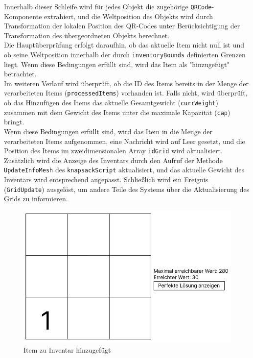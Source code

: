 Innerhalb dieser Schleife wird für jedes Objekt die zugehörige \texttt{QRCode}-Komponente extrahiert, und die Weltposition
des Objekts wird durch Transformation der lokalen Position des QR-Codes unter Berücksichtigung der Transformation des
übergeordneten Objekts berechnet.\\

Die Hauptüberprüfung erfolgt daraufhin, ob das aktuelle Item nicht null ist und ob seine Weltposition innerhalb der durch
\texttt{inventoryBounds} definierten Grenzen liegt. Wenn diese Bedingungen erfüllt sind, wird das Item als "hinzugefügt"
betrachtet.\\

Im weiteren Verlauf wird überprüft, ob die ID des Items bereits in der Menge der verarbeiteten Items (\texttt{processedItems})
vorhanden ist. Falls nicht, wird überprüft, ob das Hinzufügen des Items das aktuelle Gesamtgewicht (\texttt{currWeight})
zusammen mit dem Gewicht des Items unter die maximale Kapazität (\texttt{cap}) bringt.\\

Wenn diese Bedingungen erfüllt sind, wird das Item in die Menge der verarbeiteten Items aufgenommen, eine Nachricht wird
auf Leer gesetzt, und die Position des Items im zweidimensionalen Array \texttt{idGrid} wird aktualisiert. Zusätzlich
wird die Anzeige des Inventars durch den Aufruf der Methode \texttt{UpdateInfoMesh} des \texttt{knapsackScript}
aktualisiert, und das aktuelle Gewicht des Inventars wird entsprechend angepasst. Schließlich wird ein Ereignis
(\texttt{GridUpdate}) ausgelöst, um andere Teile des Systems über die Aktualisierung des Grids zu informieren.
\begin{figure}[h]
    \centering
    \includegraphics[scale=0.6]{images/itemAdded}
    \caption{Item zu Inventar hinzugefügt}
    \label{fig:controller_itemAdded}
\end{figure}

